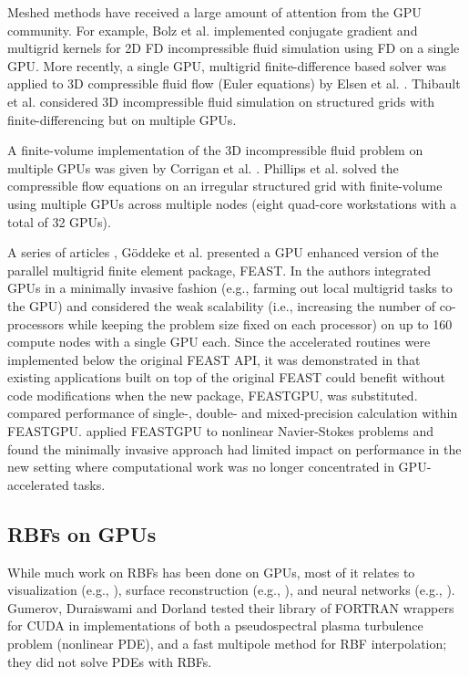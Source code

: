 Meshed methods have received a large amount of attention from the GPU community. For example, Bolz et al. \cite{Bolz:2003} implemented conjugate gradient and multigrid kernels for 2D FD incompressible fluid simulation using FD on a single GPU.  More recently, a single GPU, multigrid finite-difference based solver was applied to 3D compressible fluid flow (Euler equations) by Elsen et al. \cite{Elsen:2008}. Thibault et al. \cite{Thibault:2009} considered 3D incompressible fluid simulation on structured grids with finite-differencing but on multiple GPUs. 

A finite-volume implementation of the 3D incompressible fluid problem on multiple GPUs was given by Corrigan et al. \cite{Corrigan:2009}. Phillips et al. \cite{Phillips:2009} solved the compressible flow equations on an irregular structured grid with finite-volume using multiple GPUs across multiple nodes (eight quad-core workstations with a total of 32 GPUs). 

A series of articles \cite{Goeddeke:2007, Goeddeke:2008a, Goeddeke:2008b, Goeddeke:2009a}, G\"{o}ddeke et al. presented 
a GPU enhanced version of the parallel multigrid finite element package, FEAST. In \cite{Goeddeke:2007} the authors integrated 
GPUs in a minimally invasive fashion (e.g., farming out local multigrid tasks to the GPU) and considered the weak scalability (i.e., 
increasing the number of co-processors while keeping the problem size fixed on each processor) on up to 160 compute nodes with a 
single GPU each.  Since the accelerated routines were implemented below the original FEAST API, it was demonstrated in 
\cite{Goeddeke:2008a} that existing applications built on top of the original FEAST could benefit without code modifications when 
the 
new package, FEASTGPU, was substituted. \cite{Goeddeke:2008b} compared performance of single-,  double- and 
mixed-precision calculation within FEASTGPU. \cite{Goeddeke:2009a} applied FEASTGPU to nonlinear Navier-Stokes 
problems and 
found the minimally invasive approach had limited impact on performance in the new setting where computational work was no longer  
concentrated in GPU-accelerated tasks. 


\subsection{RBFs on GPUs}

While much work on RBFs has been done on GPUs, most of it relates to visualization (e.g., \cite{Cuntz:2007, Weiler:2005}),  surface reconstruction (e.g., \cite{Corrigan:2005,Carr:2003}), and neural networks (e.g., \cite{Brandstetter:2008}). Gumerov, Duraiswami and Dorland \cite{Gumerov:2007a, Gumerov:2007b} tested their library of FORTRAN wrappers for CUDA in implementations of both a pseudospectral plasma turbulence problem (nonlinear PDE), and a fast multipole method for RBF interpolation; they did not solve PDEs with RBFs. 

